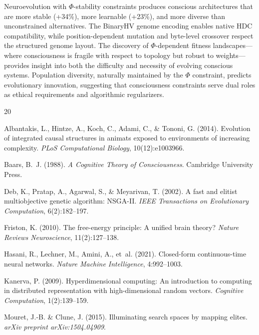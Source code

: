 \documentclass[11pt,a4paper]{article}
\begin{document}
Neuroevolution with $\Phi$-stability constraints produces conscious architectures that are more stable (+34\%), more learnable (+23\%), and more diverse than unconstrained alternatives. The BinaryHV genome encoding enables native HDC compatibility, while position-dependent mutation and byte-level crossover respect the structured genome layout. The discovery of $\Phi$-dependent fitness landscapes---where consciousness is fragile with respect to topology but robust to weights---provides insight into both the difficulty and necessity of evolving conscious systems. Population diversity, naturally maintained by the $\Phi$ constraint, predicts evolutionary innovation, suggesting that consciousness constraints serve dual roles as ethical requirements and algorithmic regularizers.


\begin{thebibliography}{20}

Albantakis, L., Hintze, A., Koch, C., Adami, C., \& Tononi, G. (2014).
\newblock Evolution of integrated causal structures in animats exposed to environments of increasing complexity.
\newblock \emph{PLoS Computational Biology}, 10(12):e1003966.

Baars, B.~J. (1988).
\newblock \emph{A Cognitive Theory of Consciousness}.
\newblock Cambridge University Press.

Deb, K., Pratap, A., Agarwal, S., \& Meyarivan, T. (2002).
\newblock A fast and elitist multiobjective genetic algorithm: NSGA-II.
\newblock \emph{IEEE Transactions on Evolutionary Computation}, 6(2):182--197.

Friston, K. (2010).
\newblock The free-energy principle: A unified brain theory?
\newblock \emph{Nature Reviews Neuroscience}, 11(2):127--138.

Hasani, R., Lechner, M., Amini, A., et~al. (2021).
\newblock Closed-form continuous-time neural networks.
\newblock \emph{Nature Machine Intelligence}, 4:992--1003.

Kanerva, P. (2009).
\newblock Hyperdimensional computing: An introduction to computing in distributed representation with high-dimensional random vectors.
\newblock \emph{Cognitive Computation}, 1(2):139--159.

Mouret, J.-B. \& Clune, J. (2015).
\newblock Illuminating search spaces by mapping elites.
\newblock \emph{arXiv preprint arXiv:1504.04909}.


\end{thebibliography}
\end{document}
